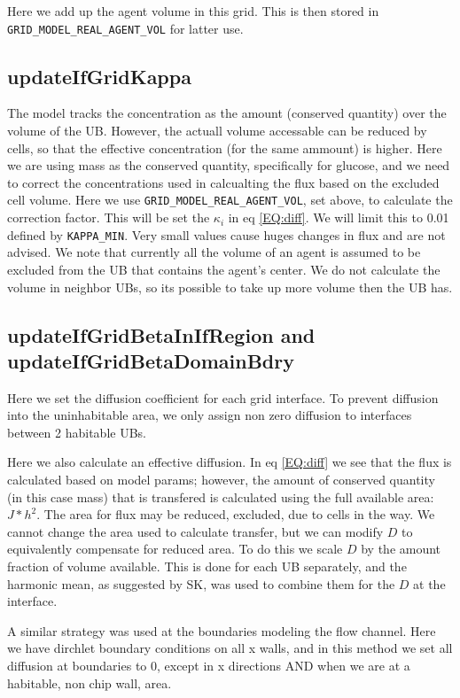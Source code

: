 \documentclass{article}
\begin{document}
Here we add up the agent volume in this grid.
This is then stored in \texttt{GRID\_MODEL\_REAL\_AGENT\_VOL} for latter use.

\subsection{updateIfGridKappa}


The model tracks the concentration as the amount (conserved quantity) over the volume of the UB.
However, the actuall volume accessable can be reduced by cells, 
so that the effective concentration (for the same ammount) is higher.
Here we are using mass as the conserved quantity, specifically for glucose,
and we need to correct the concentrations used in calcualting the flux based on the excluded cell volume.
Here we use \texttt{GRID\_MODEL\_REAL\_AGENT\_VOL}, set above, 
to calculate the correction factor.
This will be set the $\kappa_i$ in eq \ref{EQ:diff}.
We will limit this to 0.01 defined by \texttt{KAPPA\_MIN}.
Very small values cause huges changes in flux and are not advised.
We note that currently all the volume of an agent is assumed to be excluded from the UB that contains the agent's center.
We do not calculate the volume in neighbor UBs, so its possible to take up more volume then the UB has.

\subsection{updateIfGridBetaInIfRegion and updateIfGridBetaDomainBdry}
Here we set the diffusion coefficient for each grid interface.
To prevent diffusion into the uninhabitable area, 
we only assign non zero diffusion to interfaces between 2 habitable UBs.

Here we also calculate an effective diffusion.
In eq \ref{EQ:diff} we see that the flux is calculated based on model params;
however, the amount of conserved quantity (in this case mass) that is transfered is calculated using the full available area: $J*h^2$.
The area for flux may be reduced, excluded, due to cells in the way.
We cannot change the area used to calculate transfer,
but we can modify $D$ to equivalently compensate for reduced area.
To do this we scale $D$ by the amount fraction of volume available.
This is done for each UB separately, and the harmonic mean,
as suggested by SK, was used to combine them for the $D$ at the interface.

A similar strategy was used at the boundaries modeling the flow channel.
Here we have dirchlet boundary conditions on all x walls,
and in this method we set all diffusion at boundaries to 0, except 
in x directions AND when we are at a habitable, non chip wall, area.
 
\end{document}
